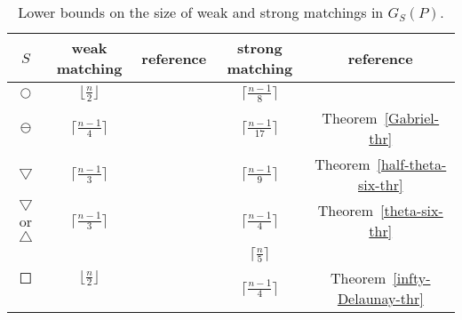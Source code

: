 \documentclass[11pt,a4paper]{article}
\newcommand{\G}[2]{G_{#1}({#2})}
\newcommand{\disc}{\Circle}
\newcommand{\trid}{\bigtriangledown}
\newcommand{\triu}{\bigtriangleup}
\begin{document}
\begin{table}
\centering
\begin{minipage}{13cm}\centering
\caption{Lower bounds on the size of weak and strong matchings in $\G{S}{P}$.}
\label{table1}
    \begin{tabular}{|c|c|c||c|c|}
         \hline
             $S$ 	& weak matching & reference& strong matching &reference \\  \hline  \hline
	      {$\disc$}& 	${\lfloor \frac{n}{2}\rfloor}$&\cite{Dillencourt1990}& $\lceil\frac{n-1}{8}\rceil$&\cite{Abrego2004}\\
	      {$\ominus$} &${\lceil \frac{n-1}{4}\rceil}$&\cite{Biniaz2014} &$\lceil\frac{n-1}{17}\rceil$&Theorem~\ref{Gabriel-thr}\\  
             {$\bigtriangledown$} &${\lceil \frac{n-1}{3}\rceil}$&\cite{Babu2014} &$\lceil\frac{n-1}{9}\rceil$&Theorem~\ref{half-theta-six-thr}\\  
	    {$\trid$ or $\triu$} &$\lceil \frac{n-1}{3}\rceil$& \cite{Babu2014} &$\lceil\frac{n-1}{4}\rceil$&Theorem~\ref{theta-six-thr}\\ \hline\hline
	    \multirow{2}{*}{$\Square$}& \multirow{2}{*}{$\lfloor \frac{n}{2}\rfloor$} &\multirow{2}{*}{\cite{Abrego2004, Abrego2009}}&
	    $\lceil\frac{n}{5}\rceil$ & \cite{Abrego2004, Abrego2009}       \\ 
		& &	& $\lceil\frac{n-1}{4}\rceil$& Theorem~\ref{infty-Delaunay-thr} \\ \hline
    \end{tabular}
    \end{minipage}
\end{table}
\end{document}
